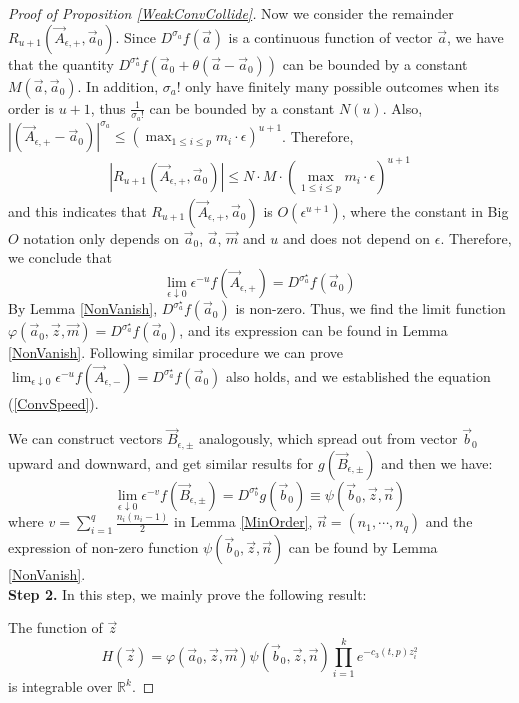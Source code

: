 \begin{proof}[Proof of Proposition \ref{WeakConvCollide}]
Now we consider the remainder $R_{u+1}(\vec{A}_{\epsilon,+},\vec{a}_{0})$. Since $D^{\sigma_{a}}f(\vec{a})$ is a continuous function of vector $\vec{a}$, we have that the quantity $D^{\sigma_{a}^{\star}}f(\vec{a}_{0}+\theta(\vec{a}-\vec{a}_{0}))$ can be bounded by a constant $M(\vec{a},\vec{a}_{0})$. In addition, $\sigma_{a}!$ only have finitely many possible outcomes when its order is $u+1$, thus $\frac{1}{\sigma_{a}!}$ can be bounded by a constant $N(u)$. Also, $|(\vec{A}_{\epsilon,+}-\vec{a}_{0})|^{\sigma_{a}}\leq (\max_{1\leq i\leq p}m_{i}\cdot \epsilon)^{u+1}$. Therefore,
\begin{align*}
	|R_{u+1}(\vec{A}_{\epsilon,+},\vec{a}_{0})|\leq N\cdot M \cdot (\max_{1\leq i\leq p}m_{i}\cdot \epsilon)^{u+1}
\end{align*}
and this indicates that $R_{u+1}(\vec{A}_{\epsilon,+},\vec{a}_{0})$ is $O(\epsilon^{u+1})$, where the constant in Big $O$ notation only depends on $\vec{a}_{0}$, $\vec{a}$, $\vec{m}$ and $u$ and does not depend on $\epsilon$. Therefore, we conclude that 
$$\lim_{\epsilon\downarrow 0}\epsilon^{-u}f(\vec{A}_{\epsilon,+})=D^{\sigma_{a}^{\star}}f(\vec{a}_{0})$$
By Lemma \ref{NonVanish}, $D^{\sigma_{a}^{\star}}f(\vec{a}_{0})$ is non-zero. Thus, we find the limit function $\varphi(\vec{a}_{0},\vec{z},\vec{m})=D^{\sigma_{a}^{\star}}f(\vec{a}_{0})$, and its expression can be found in Lemma \ref{NonVanish}. Following similar procedure we can prove $\lim_{\epsilon\downarrow 0}\epsilon^{-u}f(\vec{A}_{\epsilon,-})=D^{\sigma_{a}^{\star}}f(\vec{a}_{0})$ also holds, and we established the equation (\ref{ConvSpeed}).

We can construct vectors $\vec{B}_{\epsilon,\pm}$ analogously, which spread out from vector $\vec{b}_{0}$ upward and downward, and get similar results for $g(\vec{B}_{\epsilon,\pm})$ and then we have:
$$\lim_{\epsilon\downarrow 0}\epsilon^{-v}f(\vec{B}_{\epsilon,\pm})=D^{\sigma_{b}^{\star}}g(\vec{b}_{0})\equiv\psi(\vec{b}_{0},\vec{z},\vec{n})$$
where $v=\sum_{i=1}^{q}\frac{n_{i}(n_{i}-1)}{2}$ in Lemma \ref{MinOrder}, $\vec{n}=(n_{1},\cdots,n_{q})$ and the expression of non-zero function $\psi(\vec{b}_{0},\vec{z},\vec{n})$ can be found by Lemma \ref{NonVanish}.\\
\textbf{Step 2. }In this step, we mainly prove the following result:

The function of $\vec{z}$ $$H(\vec{z})=\varphi(\vec{a}_{0},\vec{z},\vec{m})\psi(\vec{b}_{0},\vec{z},\vec{n})\prod_{i=1}^{k}e^{-c_{3}(t,p)z_{i}^{2}}$$ is integrable over $\mathbb{R}^{k}$.


\end{proof}
